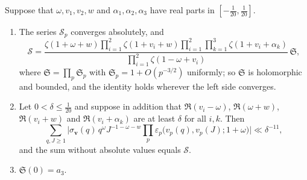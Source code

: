 \documentclass[11pt,colorlinks]{charlie}
\begin{document}
\begin{lemma}\label{lem:baleuler}
Suppose that $\omega,v_1,v_2,w$ and $\alpha_1,\alpha_2,\alpha_3$ have real parts in $[-\frac1{20},\frac1{20}]$.
\begin{enumerate}[label=\textup{(\roman*)}]
\item The series $\mathcal S_p$ converges absolutely, and
\[
 \mathcal S=\frac{\zeta(1+\omega+w)\prod_{i=1}^2\zeta(1+v_i+w)\prod_{i=1}^2\prod_{k=1}^3\zeta(1+v_i+\alpha_k)}{\prod_{i=1}^2\zeta(1-\omega+v_i)}\,\mathfrak S,
\]
where $\mathfrak S=\prod_p\mathfrak S_p$ with $\mathfrak S_p=1+O(p^{-3/2})$ uniformly; so $\mathfrak S$ is holomorphic and bounded, and the identity holds wherever the left side converges.
\item Let $0<\delta\le\frac1{20}$ and suppose in addition that $\Re(v_i-\omega)$, $\Re(\omega+w)$, $\Re(v_i+w)$ and $\Re(v_i+\alpha_k)$ are at least $\delta$ for all $i,k$. Then
\[
 \sum_{q,J\ge1}\Big|\sigma_{\boldsymbol v}(q)\,q^{\omega}J^{-1-\omega-w}\prod_{p}\varepsilon_p\big(v_p(q),v_p(J);1+\omega\big)\Big|\ll\delta^{-11},
\]
and the sum without absolute values equals $\mathcal S$.
\item $\mathfrak S(0)=a_3$.
\end{enumerate}
\end{lemma}
\end{document}
